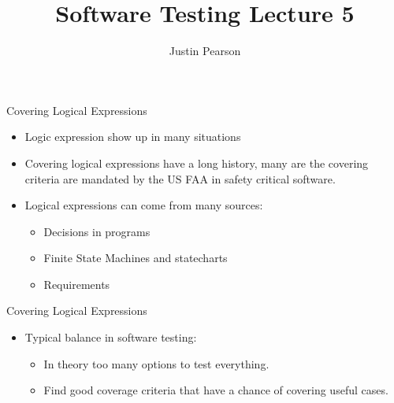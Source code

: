 \documentclass{beamer}
\title{Software Testing  Lecture 5}
\author{Justin Pearson}
\begin{document}
\lstset{language=C}

\begin{frame}
  \maketitle
\end{frame}

\begin{frame}{Covering Logical Expressions}
  \begin{itemize}
  \item Logic expression show up in many situations
  \item Covering logical expressions have a long history, many are the
    covering criteria are mandated by the US FAA in safety critical
    software.
  \item Logical expressions can come from many sources:
    \begin{itemize}
    \item Decisions in programs
    \item Finite State Machines and statecharts 
    \item Requirements
    \end{itemize}
  \end{itemize}
  
\end{frame}
\begin{frame}{Covering Logical Expressions}
  \begin{itemize}
  \item Typical balance in software testing:
    \begin{itemize}
    \item In theory too many options to test everything.
    \item Find good coverage criteria that have a chance of covering
      useful cases. 
    \end{itemize}
  \end{itemize}  
\end{frame}
\end{document}
